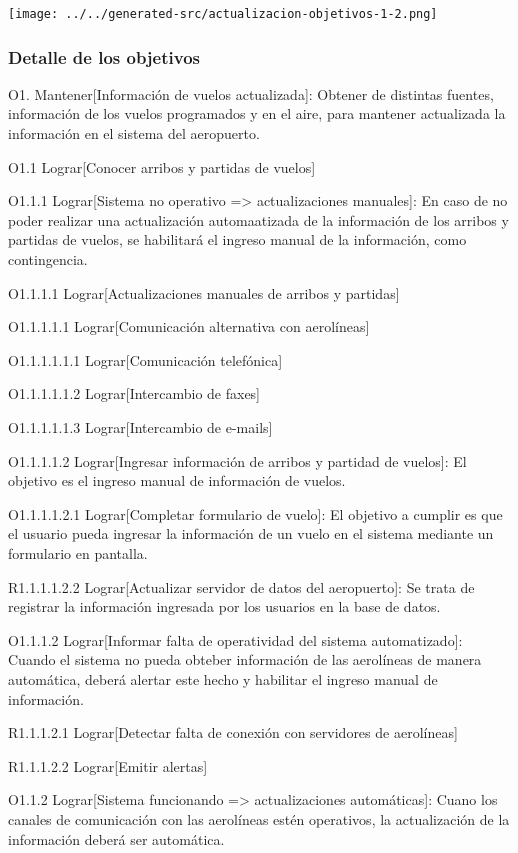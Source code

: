 \texttt{[image: ../../generated-src/actualizacion-objetivos-1-2.png]}

\subsubsection{Detalle de los objetivos}
O1.          Mantener[Información de vuelos actualizada]: Obtener de distintas fuentes, información de los vuelos programados y en el aire, para mantener actualizada la información en el sistema del aeropuerto.

O1.1         Lograr[Conocer arribos y partidas de vuelos]

O1.1.1       Lograr[Sistema no operativo => actualizaciones manuales]: En caso de no poder realizar una actualización automaatizada de la información de los arribos y partidas de vuelos, se habilitará el ingreso manual de la información, como contingencia.

O1.1.1.1     Lograr[Actualizaciones manuales de arribos y partidas]

O1.1.1.1.1   Lograr[Comunicación alternativa con aerolíneas]

O1.1.1.1.1.1 Lograr[Comunicación telefónica]

O1.1.1.1.1.2 Lograr[Intercambio de faxes]

O1.1.1.1.1.3 Lograr[Intercambio de e-mails]

O1.1.1.1.2   Lograr[Ingresar información de arribos y partidad de vuelos]: El objetivo es el ingreso manual de información de vuelos.

O1.1.1.1.2.1 Lograr[Completar formulario de vuelo]: El objetivo a cumplir es que el usuario pueda ingresar la información de un vuelo en el sistema mediante un formulario en pantalla.

R1.1.1.1.2.2 Lograr[Actualizar servidor de datos del aeropuerto]: Se trata de registrar la información ingresada por los usuarios en la base de datos.

O1.1.1.2     Lograr[Informar falta de operatividad del sistema automatizado]: Cuando el sistema no pueda obteber información de las aerolíneas de manera automática, deberá alertar este hecho y habilitar el ingreso manual de información.

R1.1.1.2.1   Lograr[Detectar falta de conexión con servidores de aerolíneas]

R1.1.1.2.2   Lograr[Emitir alertas]

O1.1.2       Lograr[Sistema funcionando => actualizaciones automáticas]: Cuano los canales de comunicación con las aerolíneas estén operativos, la actualización de la información deberá ser automática.

